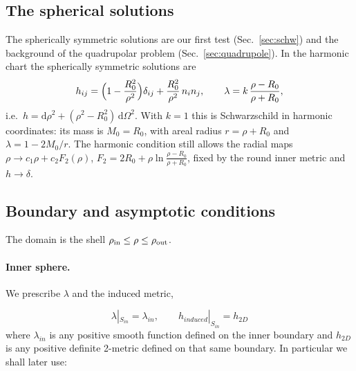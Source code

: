 \documentclass[aps,prd,twocolumn,superscriptaddress, nofootinbib,floatfix]{revtex4-2}
\newcommand{\dd}{\mathrm{d}}
\begin{document}
\subsection{The spherical solutions}\label{sec:spherical}

The spherically symmetric solutions are our first test (Sec.~\ref{sec:schw}) and the background of the quadrupolar problem (Sec.~\ref{sec:quadrupole}).
In the harmonic chart the spherically symmetric solutions are
\begin{equation}
  h_{ij} = \Bigl(1-\frac{R_0^2}{\rho^2}\Bigr)\delta_{ij} + \frac{R_0^2}{\rho^2}\,n_in_j , \qquad
  \lambda = k\,\frac{\rho-R_0}{\rho+R_0} ,
  \label{eq:schw}
\end{equation}
i.e.\ $h = \dd\rho^2+(\rho^2-R_0^2)\,\dd\Omega^2$.
With $k=1$ this is Schwarzschild in harmonic coordinates: its mass is $M_0 = R_0$, with areal radius $r = \rho+R_0$ and $\lambda = 1-2M_0/r$.
The harmonic condition still allows the radial maps $\rho\to c_1\rho + c_2 F_2(\rho)$, $F_2 = 2R_0+\rho\ln\frac{\rho-R_0}{\rho+R_0}$, fixed by the round inner metric and $h\to\delta$.

\subsection{Boundary and asymptotic conditions}\label{sec:bcs}

The domain is the shell $\rho_{\rm in}\le\rho\le\rho_{\rm out}$.

\paragraph{Inner sphere.} We prescribe $\lambda$ and the induced metric,

\begin{equation}
  \lambda|_{S_{in}} = \lambda_{in}, \qquad h_{induced}|_{S_{in}} = h_{2D}
\end{equation}
where $\lambda_{in}$ is any positive smooth function defined on the inner boundary and $h_{2D}$ is any positive definite 2-metric defined on that same boundary.
In particular we shall later use:
\end{document}
